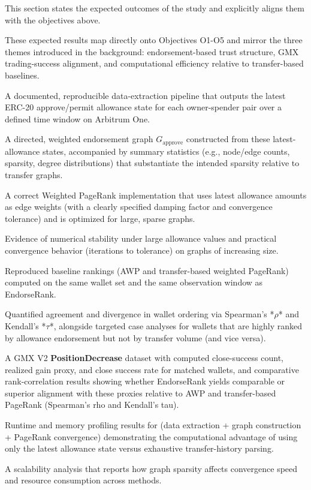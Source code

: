This section states the expected outcomes of the study and explicitly aligns them with the objectives above.


These expected results map directly onto Objectives O1-O5 and mirror the three themes introduced in the background: endorsement-based trust structure, GMX trading-success alignment, and computational efficiency relative to transfer-based baselines.



A documented, reproducible data-extraction pipeline that outputs the latest ERC-20 approve/permit allowance state for each owner-spender pair over a defined time window on Arbitrum One.


A directed, weighted endorsement graph $G_{\text{approve}}$ constructed from these latest-allowance states, accompanied by summary statistics (e.g., node/edge counts, sparsity, degree distributions) that substantiate the intended sparsity relative to transfer graphs.



A correct Weighted PageRank implementation that uses latest allowance amounts as edge weights (with a clearly specified damping factor and convergence tolerance) and is optimized for large, sparse graphs.


Evidence of numerical stability under large allowance values and practical convergence behavior (iterations to tolerance) on graphs of increasing size.



Reproduced baseline rankings (AWP and transfer-based weighted PageRank) computed on the same wallet set and the same observation window as EndorseRank.


Quantified agreement and divergence in wallet ordering via Spearman's *\(\rho\)* and Kendall's *\(\tau\)*, alongside targeted case analyses for wallets that are highly ranked by allowance endorsement but not by transfer volume (and vice versa).



A GMX V2 \textbf{PositionDecrease} dataset with computed close-success count, realized gain proxy, and close success rate for matched wallets, and comparative rank-correlation results showing whether EndorseRank yields comparable or superior alignment with these proxies relative to AWP and transfer-based PageRank (Spearman's rho and Kendall's tau).



Runtime and memory profiling results for (data extraction + graph construction + PageRank convergence) demonstrating the computational advantage of using only the latest allowance state versus exhaustive transfer-history parsing.


A scalability analysis that reports how graph sparsity affects convergence speed and resource consumption across methods.
